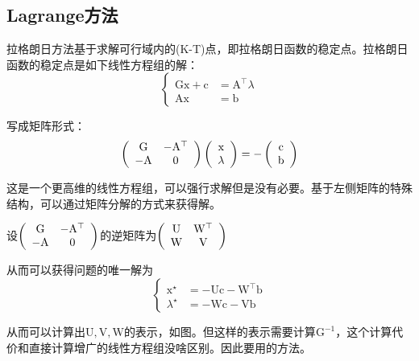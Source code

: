 \documentclass[a4paper]{D:/repositories/MyDGP/latex/PaperReadingLog}
\begin{document}
\subsection{Lagrange方法}
拉格朗日方法基于求解可行域内的(K-T)点，即拉格朗日函数的稳定点。拉格朗日函数的稳定点是如下线性方程组的解：
$$\left\{
    \begin{aligned}
        \mathrm{G}\mathrm{x}+\mathrm{c}&=\mathrm{A}^\top\lambda\\
        \mathrm{A}\mathrm{x}&=\mathrm{b}
    \end{aligned}
    \right.
$$

写成矩阵形式：
$$
\left(
    \begin{array}[]{cc}
        \mathrm{G} & -\mathrm{A}^\top \\
        -\mathrm{A} & 0        
    \end{array}
\right)
\left(
    \begin{array}[]{c}
        \mathrm{x} \\ \lambda
    \end{array}
\right)
=
-\left(\begin{array}[]{c}
    \mathrm{c} \\ \mathrm{b}
\end{array}
\right)
$$

这是一个更高维的线性方程组，可以强行求解但是没有必要。基于左侧矩阵的特殊结构，可以通过矩阵分解的方式来获得解。

设$
\left(
    \begin{array}[]{cc}
        \mathrm{G} & -\mathrm{A}^\top \\
        -\mathrm{A} & 0        
    \end{array}
\right)$的逆矩阵为$
\left(
    \begin{array}[]{cc}
        \mathrm{U} & \mathrm{W}^\top \\
        \mathrm{W} & \mathrm{V}        
    \end{array}
\right)$

从而可以获得问题的唯一解为
$$
\left\{\begin{aligned}
    \mathrm{x}^\star&=-\mathrm{U}\mathrm{c}-\mathrm{W}^\top\mathrm{b}\\
    \lambda^\star&=-\mathrm{W}\mathrm{c}-\mathrm{V}\mathrm{b}
\end{aligned}
\right.
$$

从而可以计算出$\mathrm{U},\mathrm{V},\mathrm{W}$的表示，如图。但这样的表示需要计算$\mathrm{G}^{-1}$，这个计算代价和直接计算增广的线性方程组没啥区别。因此要用的方法。
\end{document}
